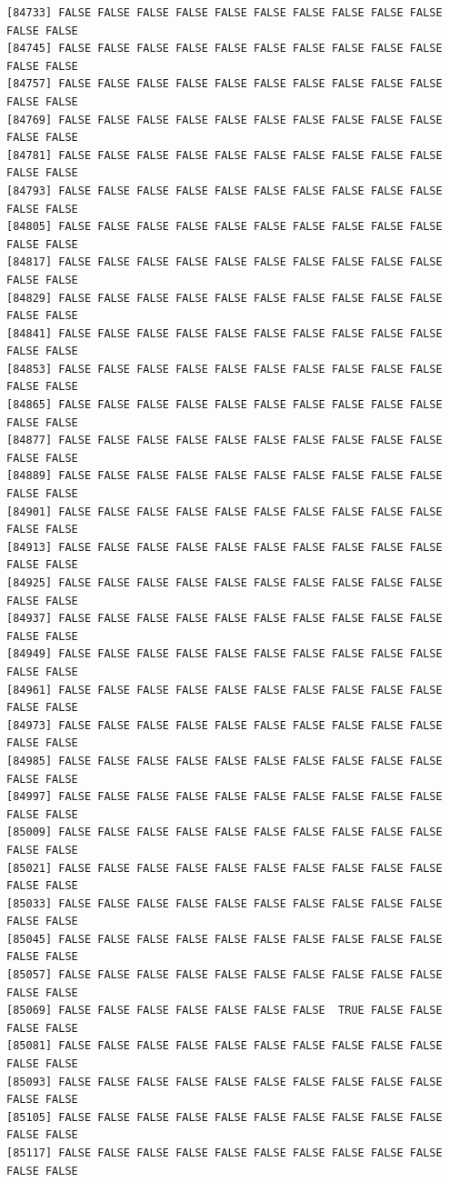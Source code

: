 \documentclass[
  a4paper,
  DIV=11,
  numbers=noendperiod]{scrartcl}
\begin{document}
\begin{verbatim}
[84733] FALSE FALSE FALSE FALSE FALSE FALSE FALSE FALSE FALSE FALSE FALSE FALSE
[84745] FALSE FALSE FALSE FALSE FALSE FALSE FALSE FALSE FALSE FALSE FALSE FALSE
[84757] FALSE FALSE FALSE FALSE FALSE FALSE FALSE FALSE FALSE FALSE FALSE FALSE
[84769] FALSE FALSE FALSE FALSE FALSE FALSE FALSE FALSE FALSE FALSE FALSE FALSE
[84781] FALSE FALSE FALSE FALSE FALSE FALSE FALSE FALSE FALSE FALSE FALSE FALSE
[84793] FALSE FALSE FALSE FALSE FALSE FALSE FALSE FALSE FALSE FALSE FALSE FALSE
[84805] FALSE FALSE FALSE FALSE FALSE FALSE FALSE FALSE FALSE FALSE FALSE FALSE
[84817] FALSE FALSE FALSE FALSE FALSE FALSE FALSE FALSE FALSE FALSE FALSE FALSE
[84829] FALSE FALSE FALSE FALSE FALSE FALSE FALSE FALSE FALSE FALSE FALSE FALSE
[84841] FALSE FALSE FALSE FALSE FALSE FALSE FALSE FALSE FALSE FALSE FALSE FALSE
[84853] FALSE FALSE FALSE FALSE FALSE FALSE FALSE FALSE FALSE FALSE FALSE FALSE
[84865] FALSE FALSE FALSE FALSE FALSE FALSE FALSE FALSE FALSE FALSE FALSE FALSE
[84877] FALSE FALSE FALSE FALSE FALSE FALSE FALSE FALSE FALSE FALSE FALSE FALSE
[84889] FALSE FALSE FALSE FALSE FALSE FALSE FALSE FALSE FALSE FALSE FALSE FALSE
[84901] FALSE FALSE FALSE FALSE FALSE FALSE FALSE FALSE FALSE FALSE FALSE FALSE
[84913] FALSE FALSE FALSE FALSE FALSE FALSE FALSE FALSE FALSE FALSE FALSE FALSE
[84925] FALSE FALSE FALSE FALSE FALSE FALSE FALSE FALSE FALSE FALSE FALSE FALSE
[84937] FALSE FALSE FALSE FALSE FALSE FALSE FALSE FALSE FALSE FALSE FALSE FALSE
[84949] FALSE FALSE FALSE FALSE FALSE FALSE FALSE FALSE FALSE FALSE FALSE FALSE
[84961] FALSE FALSE FALSE FALSE FALSE FALSE FALSE FALSE FALSE FALSE FALSE FALSE
[84973] FALSE FALSE FALSE FALSE FALSE FALSE FALSE FALSE FALSE FALSE FALSE FALSE
[84985] FALSE FALSE FALSE FALSE FALSE FALSE FALSE FALSE FALSE FALSE FALSE FALSE
[84997] FALSE FALSE FALSE FALSE FALSE FALSE FALSE FALSE FALSE FALSE FALSE FALSE
[85009] FALSE FALSE FALSE FALSE FALSE FALSE FALSE FALSE FALSE FALSE FALSE FALSE
[85021] FALSE FALSE FALSE FALSE FALSE FALSE FALSE FALSE FALSE FALSE FALSE FALSE
[85033] FALSE FALSE FALSE FALSE FALSE FALSE FALSE FALSE FALSE FALSE FALSE FALSE
[85045] FALSE FALSE FALSE FALSE FALSE FALSE FALSE FALSE FALSE FALSE FALSE FALSE
[85057] FALSE FALSE FALSE FALSE FALSE FALSE FALSE FALSE FALSE FALSE FALSE FALSE
[85069] FALSE FALSE FALSE FALSE FALSE FALSE FALSE  TRUE FALSE FALSE FALSE FALSE
[85081] FALSE FALSE FALSE FALSE FALSE FALSE FALSE FALSE FALSE FALSE FALSE FALSE
[85093] FALSE FALSE FALSE FALSE FALSE FALSE FALSE FALSE FALSE FALSE FALSE FALSE
[85105] FALSE FALSE FALSE FALSE FALSE FALSE FALSE FALSE FALSE FALSE FALSE FALSE
[85117] FALSE FALSE FALSE FALSE FALSE FALSE FALSE FALSE FALSE FALSE FALSE FALSE

\end{verbatim}
\end{document}
